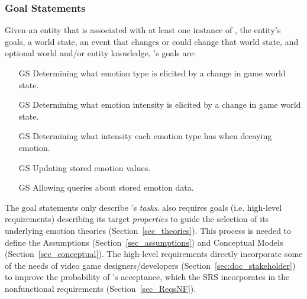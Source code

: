 \subsubsection{Goal Statements}\label{sec_goals}
Given an entity that is associated with at least one instance of \progname{},
the entity's goals, a world state, an event that changes or could change that
world state, and optional world and/or entity knowledge, \progname{}'s goals
are:
\begin{itemize}

    \item[GS\refstepcounter{goalnum}\thegoalnum \label{G_EmotionElicitation}]
    Determining what emotion type is elicited by a change in game world state.

    \item[GS\refstepcounter{goalnum}\thegoalnum \label{G_EmotionIntensity}]
    Determining what emotion intensity is elicited by a change in game world
    state.

    \item[GS\refstepcounter{goalnum}\thegoalnum \label{G_EmotionDecay}]
    Determining what intensity each emotion type has when decaying emotion.

    \item[GS\refstepcounter{goalnum}\thegoalnum \label{G_UpdateEmotionState}]
    Updating stored emotion values.

    \item[GS\refstepcounter{goalnum}\thegoalnum \label{G_QueryEmotionState}]
    Allowing queries about stored emotion data.

\end{itemize}

The goal statements only describe \progname{}'s \textit{tasks}. \progname{}
also requires goals (i.e. high-level requirements) describing its target
\textit{properties} to guide the selection of its underlying emotion theories
(Section~\ref{sec_theories}). This process is needed to define the Assumptions
(Section~\ref{sec_assumptions}) and Conceptual Models
(Section~\ref{sec_conceptual}). The high-level requirements directly
incorporate some of the needs of video game designers/developers
(Section~\ref{sec:doc_stakeholder}) to improve the probability of \progname{}'s
acceptance, which the SRS incorporates in the nonfunctional requirements
(Section~\ref{sec_ReqsNF}).

